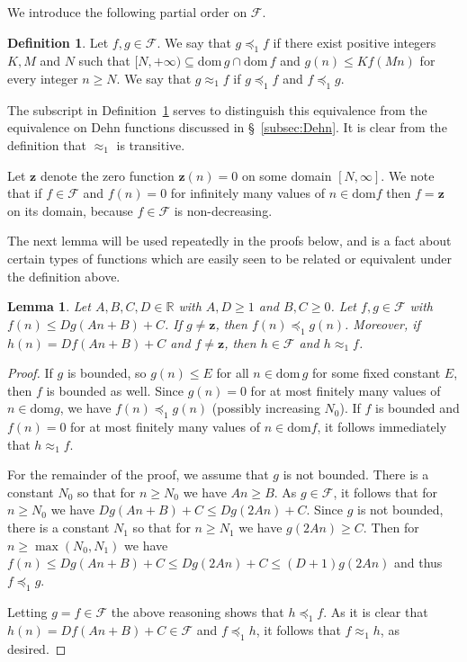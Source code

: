 \documentclass[11pt]{amsart}
\newcommand{\preceqF}{\preceq_1}
\newcommand{\approxF}{\approx_1}
\newtheorem{lemma}[theorem]{Lemma}
\theoremstyle{definition}
\newtheorem{definition}[theorem]{Definition}
\newcommand\R{\mathbb R}
\newcommand\dom{\mathrm{dom}}
\newcommand\F{\mathcal F}
\renewcommand{\geq}{\geqslant} \renewcommand{\leq}{\leqslant} \renewcommand{\ge}{\geqslant} \renewcommand{\le}{\leqslant}
\begin{document}
We introduce the following partial order on $\F$.


\begin{definition}\label{defn:equivF} Let $f,g \in   \F$. We say that $g \preceqF f$ if there exist positive integers $K,M$ and $N$ such that $[N,+\infty) \subseteq
\mathrm{dom}\,g\cap \mathrm{dom}\, f$ and $g(n)\leq Kf(Mn)$ for every integer $n\geq N$.
We say that $g \approxF f$ if $g \preceqF f$ and $f \preceqF g$.
\end{definition}
The subscript in Definition~\ref{defn:equivF} serves to distinguish this equivalence from the equivalence on Dehn functions discussed in \S\!~\ref{subsec:Dehn}.  It is clear from the definition that $\approxF$ is transitive.


Let $\mathbf z$ denote the zero function $\mathbf z (n)=0$ on
some domain $[N,\infty]$.
We note that if $f\in\F$ and $f(n)=0$ for infinitely many values of $n\in\dom f$ then $f=\mathbf z$ on its domain, because $f\in\F$ is non-decreasing. 

The next lemma will be used repeatedly in the proofs below, and is a fact about certain types of functions which are easily seen to be related or equivalent under the definition above.


\begin{lemma}
\label{lemma:lose_the_constant}
Let $A,B,C,D\in\R$ with $A, D\geq 1$ and $B,C\geq 0$.
Let $f,g \in \F$ with $f(n) \leq D g(An+B)+C$.
If $g\neq \mathbf z$, then $f(n) \preceqF g(n)$.  Moreover, if $h(n)=Df(An+B)+C$
and $f\neq \mathbf z$,
then  $h \in \F$ and $h\approxF f$.
\end{lemma}

\begin{proof}
If $g$ is bounded, so $g(n)\leq E$ for all $n\in \dom\,g$ for some fixed constant $E$, then 
$f$ is bounded as well.
Since $g(n)=0$ for at most finitely many values of $n\in\dom g$, we have $f(n) \preceqF g(n)$ (possibly increasing $N_0$).
If $f$ is bounded  and  $f(n)=0$ for at most finitely many values of $n\in\dom f$,  it follows immediately that $h\approxF f$.

For the remainder of the proof, we assume that $g$ is not bounded.
There is a constant $N_0$ so that for $n \geqslant N_0$ we have $An \geqslant B$.  As $g \in \F$, it follows that for $n \geqslant N_0$ we have $D g(An+B) +C\leq D g(2An)+C$.
Since $g$ is not bounded, there is a constant $N_1$ so that for $n \geq N_1$ we have $g(2An) \geqslant C$.
Then for $n \geq \max(N_0,N_1)$ we have $f(n) \leq D g(An+B)+C \leq D g(2An) +C \leq (D+1) g(2An)$ and thus $f \preceqF g$.

Letting $g=f \in \F$ the above reasoning shows that
$h \preceqF f$. As it is clear that
$h(n)=Df(An+B)+C \in \F$ and $f \preceqF h$,
it follows that $f \approxF h$, as desired.
\end{proof}
\end{document}
